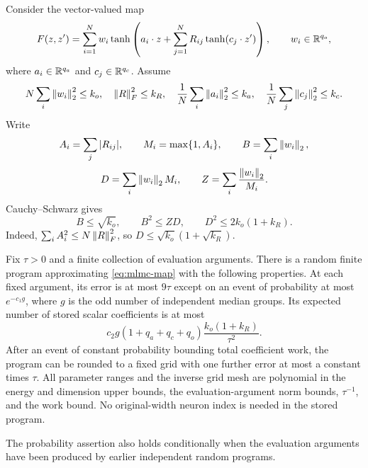 Consider the vector-valued map
\begin{equation}\label{eq:mlmc-map}
 F(z,z')=\sum_{i=1}^N w_i\tanh\left(a_i\cdot z+
                \sum_{j=1}^N R_{ij}\tanh(c_j\cdot z')\right),
 \qquad w_i\in\mathbb R^{q_o},
\end{equation}
where $a_i\in\mathbb R^{q_a}$ and $c_j\in\mathbb R^{q_c}$. Assume
\begin{equation}\label{eq:mlmc-map-energy}
 N\sum_i\left\|w_i\right\|_2^2\le k_o,\quad
 \left\|R\right\|_F^2\le k_R,\quad
 \frac1N\sum_i\left\|a_i\right\|_2^2\le k_a,\quad
 \frac1N\sum_j\left\|c_j\right\|_2^2\le k_c.
\end{equation}
Write
\[
 A_i=\sum_j|R_{ij}|,\qquad M_i=\max\{1,A_i\},\qquad
 B=\sum_i\left\|w_i\right\|_2,
\]
\begin{equation}\label{eq:mlmc-work-resources}
 D=\sum_i\left\|w_i\right\|_2M_i,\qquad
 Z=\sum_i\frac{\left\|w_i\right\|_2}{M_i}.
\end{equation}
Cauchy--Schwarz gives
\begin{equation}\label{eq:mlmc-work-energy}
 B\le\sqrt{k_o},\qquad B^2\le ZD,\qquad
 D^2\le2k_o(1+k_R).
\end{equation}
Indeed, $\sum_i A_i^2\le N\left\|R\right\|_F^2$, so
$D\le\sqrt{k_o}(1+\sqrt{k_R})$.

\begin{lemma}
\label{lem:mlmc-map-sampling}
Fix $\tau>0$ and a finite collection of evaluation arguments. There
is a random finite program approximating \eqref{eq:mlmc-map} with the
following properties. At each fixed argument, its error is at most
$9\tau$ except on an event of probability at most $e^{-c_1g}$, where
$g$ is the odd number of independent median groups. Its expected number
of stored scalar coefficients is at most
\begin{equation}\label{eq:mlmc-map-work}
 c_2g(1+q_a+q_c+q_o)
                 \frac{k_o(1+k_R)}{\tau^2}.
\end{equation}
After an event of constant probability bounding total coefficient work,
the program can be rounded to a fixed grid with one further error at
most a constant times $\tau$. All parameter ranges and the inverse
grid mesh are polynomial in the energy and dimension upper bounds,
the evaluation-argument norm bounds, $\tau^{-1}$, and the work bound.
No original-width neuron index is needed in the stored program.

The probability assertion also holds conditionally when the evaluation
arguments have been produced by earlier independent random programs.
\end{lemma}

